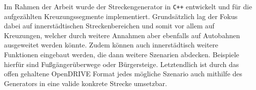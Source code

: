 Im Rahmen der Arbeit wurde der Streckengenerator in \texttt{C++} entwickelt und für die aufgezählten Kreuzungssegmente implementiert. Grundsätzlich lag der Fokus dabei auf innerstädtischen Streckenbereichen und somit vor allem auf Kreuzungen, welcher durch weitere Annahmen aber ebenfalls auf Autobahnen ausgeweitet werden könnte. Zudem können auch innerstädtisch weitere Funktionen eingebaut werden, die dann weitere Szenarien abdecken. Beispiele hierfür sind Fußgängerüberwege oder Bürgersteige. Letztendlich ist durch das offen gehaltene OpenDRIVE Format jedes mögliche Szenario auch mithilfe des Generators in eine valide konkrete Strecke umsetzbar.